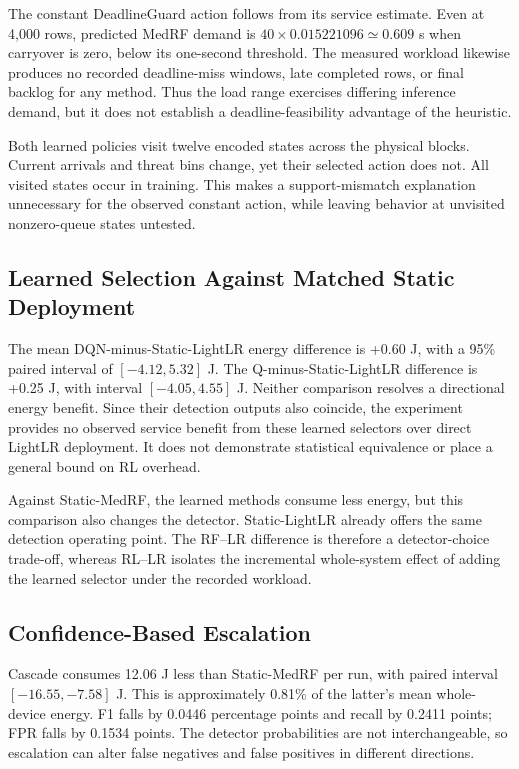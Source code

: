 \documentclass[journal]{IEEEtran}
\begin{document}
The constant DeadlineGuard action follows from its service estimate. Even at 4,000 rows, predicted MedRF demand is $40\times0.015221096\simeq0.609$ s when carryover is zero, below its one-second threshold. The measured workload likewise produces no recorded deadline-miss windows, late completed rows, or final backlog for any method. Thus the load range exercises differing inference demand, but it does not establish a deadline-feasibility advantage of the heuristic.

Both learned policies visit twelve encoded states across the physical blocks. Current arrivals and threat bins change, yet their selected action does not. All visited states occur in training. This makes a support-mismatch explanation unnecessary for the observed constant action, while leaving behavior at unvisited nonzero-queue states untested.

\subsection{Learned Selection Against Matched Static Deployment}
The mean DQN-minus-Static-LightLR energy difference is +0.60 J, with a 95\% paired interval of $[-4.12,5.32]$ J. The Q-minus-Static-LightLR difference is +0.25 J, with interval $[-4.05,4.55]$ J. Neither comparison resolves a directional energy benefit. Since their detection outputs also coincide, the experiment provides no observed service benefit from these learned selectors over direct LightLR deployment. It does not demonstrate statistical equivalence or place a general bound on RL overhead.

Against Static-MedRF, the learned methods consume less energy, but this comparison also changes the detector. Static-LightLR already offers the same detection operating point. The RF--LR difference is therefore a detector-choice trade-off, whereas RL--LR isolates the incremental whole-system effect of adding the learned selector under the recorded workload.

\subsection{Confidence-Based Escalation}
Cascade consumes 12.06 J less than Static-MedRF per run, with paired interval $[-16.55,-7.58]$ J. This is approximately 0.81\% of the latter's mean whole-device energy. F1 falls by 0.0446 percentage points and recall by 0.2411 points; FPR falls by 0.1534 points. The detector probabilities are not interchangeable, so escalation can alter false negatives and false positives in different directions.
\end{document}
